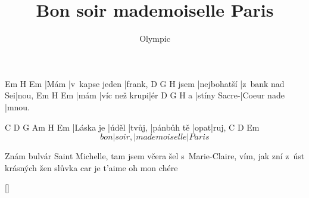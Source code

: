 \documentclass{song}
\title{Bon soir mademoiselle Paris}
\author{Olympic}
\begin{document}
\strophe
Em   H\7            Em
|Mám |v~kapse jeden |frank,
     D\7         G              H\7
jsem |nejbohatší |z~bank nad Sei|nou,
Em   H\7           Em
|mám |víc než krupi|ér
  D\7          G           H\7
a |stíny Sacre-|Coeur nade |mnou.
\endstrophe

C         D     G      Am         H\7  Em
|Láska je |úděl |tvůj, |pánbůh tě |opat|ruj,
       C      D             Em
\[ bon |soir, |mademoiselle |Paris \]
\endstrophe

\strophe*
Znám bulvár Saint Michelle,
tam jsem včera šel s~Marie-Claire,
vím, jak zní z~úst krásných žen
slůvka car je t'aime oh mon chére
\endstrophe

\ref{}
\end{document}
